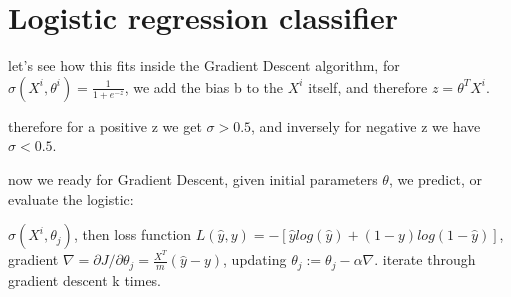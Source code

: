 \documentclass[4apaper,12pt]{book}
\begin{document}
\section{Logistic regression classifier}
\begin{description}
\item let's see how this fits inside the Gradient Descent algorithm, for $\sigma(X^i, \theta^i)=\frac{1}{1+e^{-z}}$, we add the bias b to the $X^i$ itself, and therefore $z=\theta^TX^i$.
\item therefore for a positive z we get  $\sigma>0.5$, and inversely for negative z we have $\sigma<0.5$.
\item now we ready for Gradient Descent, given initial parameters $\theta$, we predict, or evaluate the logistic:
\item$\sigma(X^i, \theta_j)$, then loss function $L(\hat{y}, y)=-[\hat{y}log(\hat{y}) + (1-y)log(1-\hat{y})]$, gradient $\nabla=\partial{J}/\partial{\theta_j} = \frac{X^T}{m}(\hat{y} - y)$, updating $\theta_j := \theta_j - \alpha\nabla$. iterate through gradient descent k times.
\end{description}
\end{document}
